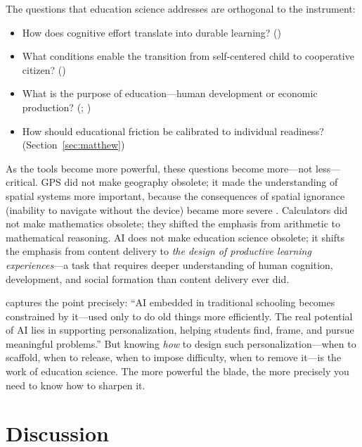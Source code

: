 \documentclass[12pt]{article}
\begin{document}
The questions that education science addresses are orthogonal to the instrument:

\begin{itemize}[leftmargin=*]
    \item How does cognitive effort translate into durable learning? (\citealt{Bjork1994desirable})
    \item What conditions enable the transition from self-centered child to cooperative citizen? (\citealt{Durkheim1956education})
    \item What is the purpose of education---human development or economic production? (\citealt{Nussbaum2010profit}; \citealt{Zhao2025meritocracy})
    \item How should educational friction be calibrated to individual readiness? (Section~\ref{sec:matthew})
\end{itemize}

As the tools become more powerful, these questions become more---not less---critical. GPS did not make geography obsolete; it made the understanding of spatial systems more important, because the consequences of spatial ignorance (inability to navigate without the device) became more severe \citep{Dahmani2020gps}. Calculators did not make mathematics obsolete; they shifted the emphasis from arithmetic to mathematical reasoning. AI does not make education science obsolete; it shifts the emphasis from content delivery to \emph{the design of productive learning experiences}---a task that requires deeper understanding of human cognition, development, and social formation than content delivery ever did.

\citet{Zhao2024grammar} captures the point precisely: ``AI embedded in traditional schooling becomes constrained by it---used only to do old things more efficiently. The real potential of AI lies in supporting personalization, helping students find, frame, and pursue meaningful problems.'' But knowing \emph{how} to design such personalization---when to scaffold, when to release, when to impose difficulty, when to remove it---is the work of education science. The more powerful the blade, the more precisely you need to know how to sharpen it.

\section{Discussion}
\label{sec:discussion}
\end{document}

